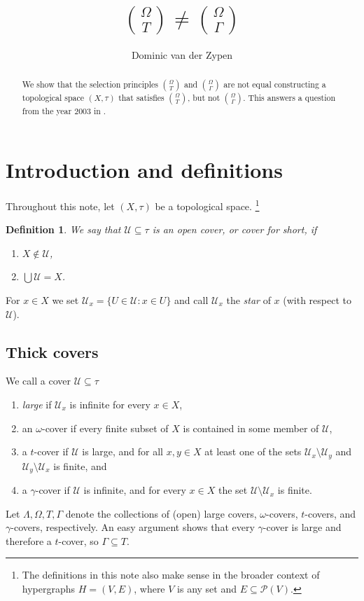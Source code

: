 \documentclass[12pt]{amsart}
\newtheorem{definition}[lemma]{\bf Definition}
\gdef\cal{\mathcal}
\begin{document}
\title{${\Omega \choose T}\neq {\Omega \choose \Gamma}$}
\author{Dominic van der Zypen}
\address{Federal Office of Borders and Customs Security,
Taubenstrasse 16, CH-3003 Bern, Switzerland}

\begin{abstract}
We show that the selection principles ${\Omega\choose T}$
and ${\Omega\choose\Gamma}$ are not equal constructing a topological
space $(X,\tau)$ that satisfies ${\Omega \choose T}$,
but not ${\Omega \choose \Gamma}$. This answers a
question from the year $2003$ in \cite{spm}.
\end{abstract}

\maketitle
\section{Introduction and definitions}
Throughout this note, let $(X,\tau)$ be a topological space.
\footnote{The definitions in this note also make sense in the
broader context of hypergraphs $H=(V,E)$, where
$V$ is any set and $E\subseteq\mathcal{P}(V)$.}
\begin{definition} \label{cov}
 We say that ${\cal U} \subseteq \tau$ is an {\em open cover}, or
  {\em cover} for short, if \begin{enumerate}
    \item $X\notin {\cal U}$,
    \item $\bigcup {\cal U} = X$.
  \end{enumerate}
\end{definition}
For $x\in X$ we set ${\cal U}_x = \{U \in {\cal U}:
x\in U\}$ and call ${\cal U}_x$ the
{\em star} of $x$ (with respect to ${\cal U}$).
\subsection{Thick covers} We call a cover ${\cal U}\subseteq \tau$
\begin{enumerate}
  \item {\em large} if ${\cal U}_x$ is infinite for every $x\in X$,
  \item an $\omega$-cover if every finite subset of $X$ is contained
    in some member of ${\cal U}$,
  \item a $t$-cover if ${\cal U}$ is large, and
    for all $x,y\in X$ at least one of the
    sets ${\cal U}_x\setminus {\cal U}_y$ and ${\cal U}_y\setminus
    {\cal U}_x$ is finite, and
  \item a $\gamma$-cover if ${\cal U}$ is infinite, and
    for every $x\in X$ the set ${\cal U}
    \setminus {\cal U}_x$ is finite.
\end{enumerate}
Let $\Lambda, \Omega, T, \Gamma$ denote the collections
of (open) large covers, $\omega$-covers, $t$-covers, and $\gamma$-covers,
respectively. An easy argument shows that every $\gamma$-cover is
large and therefore a $t$-cover, so $\Gamma \subseteq T$.
\end{document}
